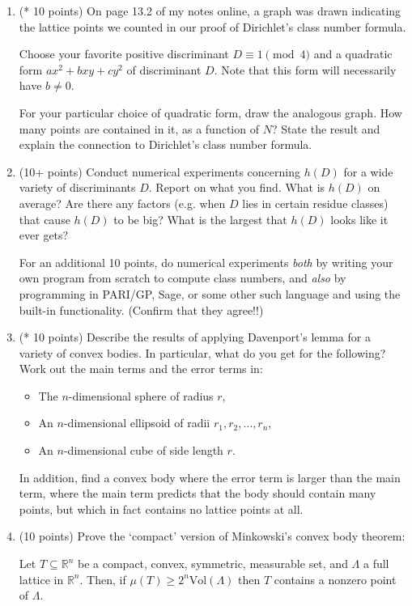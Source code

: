 \documentclass[12pt]{article}
\begin{document}
\begin{enumerate}
\item (* 10 points)
On page 13.2 of my notes online, a graph was drawn indicating the lattice points we counted
in our proof of Dirichlet's class number formula.

Choose your favorite positive discriminant $D \equiv 1 \pmod 4$ and a quadratic form
$a x^2 + bxy + cy^2$ of discriminant $D$. Note that this form will necessarily have
$b \neq 0$.

For your particular choice of quadratic form, draw the analogous graph. How many points
are contained in it, as a function of $N$? State the result and explain the connection
to Dirichlet's class number formula.

\item (10+ points)
Conduct numerical experiments concerning $h(D)$ for a wide variety of discriminants $D$.
Report on what you find. What is $h(D)$ on average? Are there any factors (e.g. when $D$
lies in certain residue classes) that cause $h(D)$ to be big? What is the largest that
$h(D)$ looks like it ever gets?

For an additional 10 points, do numerical experiments {\itshape both} by writing your
own program from scratch to compute class numbers, and {\itshape also} by programming
in PARI/GP, Sage, or some other such language and using the built-in functionality.
(Confirm that they agree!!)

\item (* 10 points)
Describe the results of applying Davenport's lemma for a variety of convex bodies. In
particular, what do you get for the following? Work out the main terms and the error terms
in:
\begin{itemize}
\item The $n$-dimensional sphere of radius $r$,
\item An $n$-dimensional ellipsoid of radii $r_1, r_2, \dots, r_n$,
\item An $n$-dimensional cube of side length $r$.
\end{itemize}
In addition, find a convex body where the error term is larger than the main term, where
the main term predicts that the body should contain many points, but which in fact contains
no lattice points at all.

\item (10 points)
Prove the `compact' version of Minkowski's convex body theorem:

Let $T \subseteq \mathbb{R}^n$ be a compact, convex, symmetric, 
measurable set, and $\Lambda$ a full lattice
in $\mathbb{R}^n$. Then, if $\mu(T) \geq 2^n {\textrm{Vol}}(\Lambda)$ then $T$
contains a nonzero point of $\Lambda$.


\end{enumerate}
\end{document}
